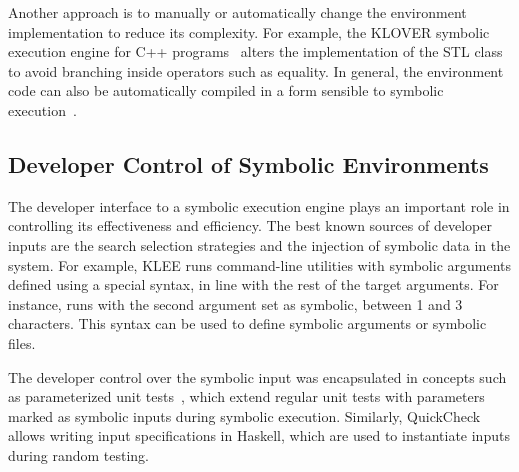 Another approach is to manually or automatically change the environment implementation to reduce its complexity.
%
For example, the KLOVER symbolic execution engine for C++ programs~\cite{klover} alters the implementation of the  STL class to avoid branching inside operators such as equality.
%
In general, the environment code can also be automatically compiled in a form sensible to symbolic execution~\cite{overify}.



\subsection{Developer Control of Symbolic Environments}

The developer interface to a symbolic execution engine plays an important role in controlling its effectiveness and efficiency.
%
The best known sources of developer inputs are the search selection strategies and the injection of symbolic data in the system.
%
For example, KLEE runs command-line utilities with symbolic arguments defined using a special syntax, in line with the rest of the target arguments.  For instance,  runs  with the second argument set as symbolic, between 1 and 3 characters.  This syntax can be used to define symbolic arguments or symbolic files.

The developer control over the symbolic input was encapsulated in concepts such as parameterized unit tests~\cite{tillmann-puts}, which extend regular unit tests with parameters marked as symbolic inputs during symbolic execution.
%
Similarly, QuickCheck~\cite{quickcheck} allows writing input specifications in Haskell, which are used to instantiate inputs during random testing.


